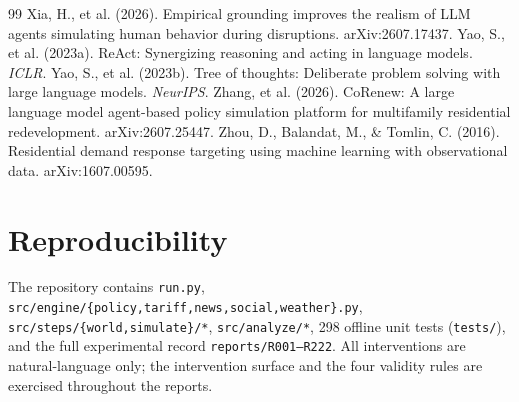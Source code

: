 \documentclass[11pt]{article}
\begin{document}
\begin{thebibliography}{99}
 Xia, H., et al. (2026). Empirical grounding improves the realism of LLM agents simulating human behavior during disruptions. arXiv:2607.17437.
 Yao, S., et al. (2023a). ReAct: Synergizing reasoning and acting in language models. \emph{ICLR}.
 Yao, S., et al. (2023b). Tree of thoughts: Deliberate problem solving with large language models. \emph{NeurIPS}.
 Zhang, et al. (2026). CoRenew: A large language model agent-based policy simulation platform for multifamily residential redevelopment. arXiv:2607.25447.
 Zhou, D., Balandat, M., \& Tomlin, C. (2016). Residential demand response targeting using machine learning with observational data. arXiv:1607.00595.
\end{thebibliography}

\appendix
\section{Reproducibility}
The repository contains \texttt{run.py}, \texttt{src/engine/\{policy,tariff,news,social,weather\}.py},
\texttt{src/steps/\{world,simulate\}/*}, \texttt{src/analyze/*}, 298 offline unit tests (\texttt{tests/}),
and the full experimental record \texttt{reports/R001--R222}. All interventions are natural-language only;
the intervention surface and the four validity rules are exercised throughout the reports.
\end{document}
